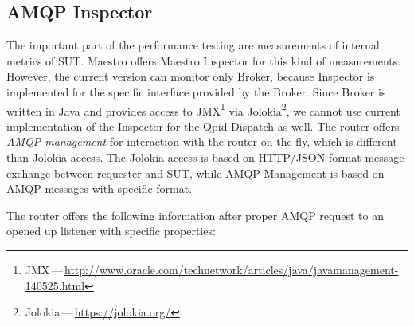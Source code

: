 \subsection{AMQP Inspector}
\label{AMQP Inspector}
The important part of the performance testing are measurements of internal metrics of SUT. Maestro offers Maestro Inspector for this kind of measurements. However, the current version can monitor only Broker, because Inspector is implemented for the specific interface provided by the Broker. Since Broker is written in Java and provides access to JMX\footnote{JMX\,---\,\url{http://www.oracle.com/technetwork/articles/java/javamanagement-140525.html}} via Jolokia\footnote{Jolokia\,---\,\url{https://jolokia.org/}}, we cannot use current implementation of the Inspector for the Qpid-Dispatch as well. The router offers \emph{AMQP management} for interaction with the router on the fly, which is different than Jolokia access. The Jolokia access is based on HTTP/JSON format message exchange between requester and SUT, while AMQP Management is based on AMQP messages with specific format.

The router offers the following information after proper AMQP request to an opened up listener with specific properties:

